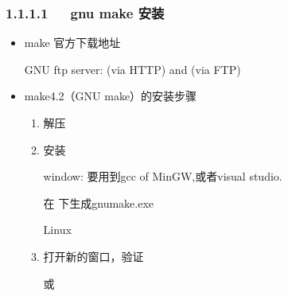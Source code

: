 \documentclass[letterpaper,12pt,english]{sphinxmanual}
\begin{document}
\subsubsection{1.1.1.1   gnu make 安装}
\label{\detokenize{001software/001install/make:gnu-make}}\begin{itemize}
\item {} 
make 官方下载地址

GNU ftp server:  (via HTTP) and  (via FTP)

\item {} 
make4.2（GNU make）的安装步骤
\begin{enumerate}
%
\item {} 
解压


\item {} 
安装

window: 要用到gcc of MinGW,或者visual studio.

\begin{sphinxVerbatim}[commandchars=\\\{\}]
\PYGZbs{}\PYGZbs{}\PYGZbs{}\PYGZbs{}\PYGZbs{}
 
 
\end{sphinxVerbatim}

在  下生成gnumake.exe

Linux

\begin{sphinxVerbatim}[commandchars=\\\{\}]
 
   
\end{sphinxVerbatim}

\item {} 
打开新的窗口，验证

 或 

\end{enumerate}

\end{itemize}
\end{document}
